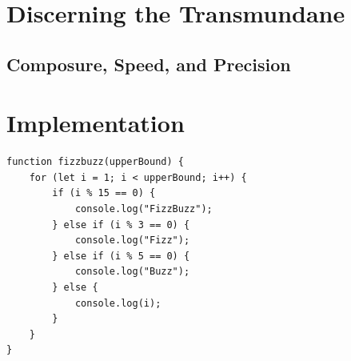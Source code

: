 \blindtext


\section{Discerning the Transmundane}

\blindtext

\subsection{Composure, Speed, and Precision}

\blindtext

\section{Implementation}

\blindtext

\begin{lstlisting}[caption={Very sophisticated code example.},label=lst:example]
function fizzbuzz(upperBound) {
    for (let i = 1; i < upperBound; i++) {
        if (i % 15 == 0) {
            console.log("FizzBuzz");
        } else if (i % 3 == 0) {
            console.log("Fizz");
        } else if (i % 5 == 0) {
            console.log("Buzz");
        } else {
            console.log(i);
        }
    }
}
\end{lstlisting}
